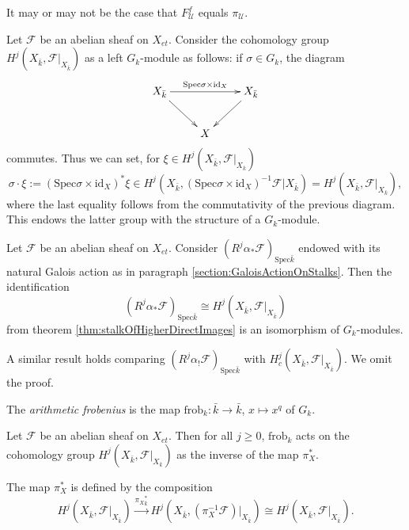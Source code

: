 \begin{remark}
It may or may not be the case that $F^f_\mathcal{U}$ equals $\pi_\mathcal{U}$.
\end{remark}

Let $\mathcal{F}$ be an abelian sheaf on $X_{et}$. Consider the cohomology 
group $H^j (X_{\bar k}, \mathcal{F}|_{X_{\bar k}})$ as a left $G_k$-module as 
follows: if $\sigma \in G_k$, the diagram 
$$
\xymatrix{
X_{\bar k} \ar[rd] \ar^{\text{Spec} \sigma \times \text{id}_X}[rr] && X_{\bar 
k} \ar[ld]\\
& X
}
$$
commutes. Thus we can set, for $\xi \in H^j (X_{\bar k}, \mathcal{F}|_{X_{\bar 
k}})$
$$
\sigma \cdot \xi := (\text{Spec} \sigma \times \text{id}_X)^*\xi \in 
H^j(X_{\bar k}, (\text{Spec} \sigma \times \text{id}_X)^{-1} 
\mathcal{F}|{X_{\bar k}})
= H^j (X_{\bar k}, \mathcal{F}|_{X_{\bar k}}),
$$
where the last equality follows from the commutativity of the previous diagram. 
This endows the latter group with the structure of a $G_k$-module.

\begin{lemma}
Let $\mathcal{F}$ be an abelian sheaf on $X_{et}$. Consider 
$(R^j\alpha_*\mathcal{F})_{\text{Spec} \bar k}$ endowed with its natural Galois 
action as in paragraph \ref{section:GaloisActionOnStalks}. Then the 
identification
$$
(R^j\alpha_*\mathcal{F})_{\text{Spec} \bar k} \cong H^j (X_{\bar k}, 
\mathcal{F}|_{X_{\bar k}})
$$
from theorem \ref{thm:stalkOfHigherDirectImages} is an isomorphism of 
$G_k$-modules.
\end{lemma}

A similar result holds comparing $(R^j\alpha_!\mathcal{F})_{\text{Spec} \bar 
k}$ with $H^j_c (X_{\bar k}, \mathcal{F}|_{X_{\bar k}})$. We omit the proof.

\begin{definition}
The \emph{arithmetic frobenius} is the map $\text{frob}_k : \bar k \to \bar k$, 
$x \mapsto x^q$  of $G_k$.
\end{definition}

\begin{theorem}
Let $\mathcal{F}$ be an abelian sheaf on $X_{et}$. Then for all $j\geq 0$, 
$\text{frob}_k$ acts on the cohomology group $H^j(X_{\bar k}, 
\mathcal{F}|_{X_{\bar k}})$ as the inverse of the map $\pi_X^*$.
\end{theorem}

The map $\pi_X^*$ is defined by the composition
$$
H^j(X_{\bar k}, \mathcal{F}|_{X_{\bar k}}) \xrightarrow{{\pi_X}_{\bar k}^*}
H^j(X_{\bar k}, (\pi_X^{-1} \mathcal{F})|_{X_{\bar k}}) \cong
H^j(X_{\bar k}, \mathcal{F}|_{X_{\bar k}}).
$$

